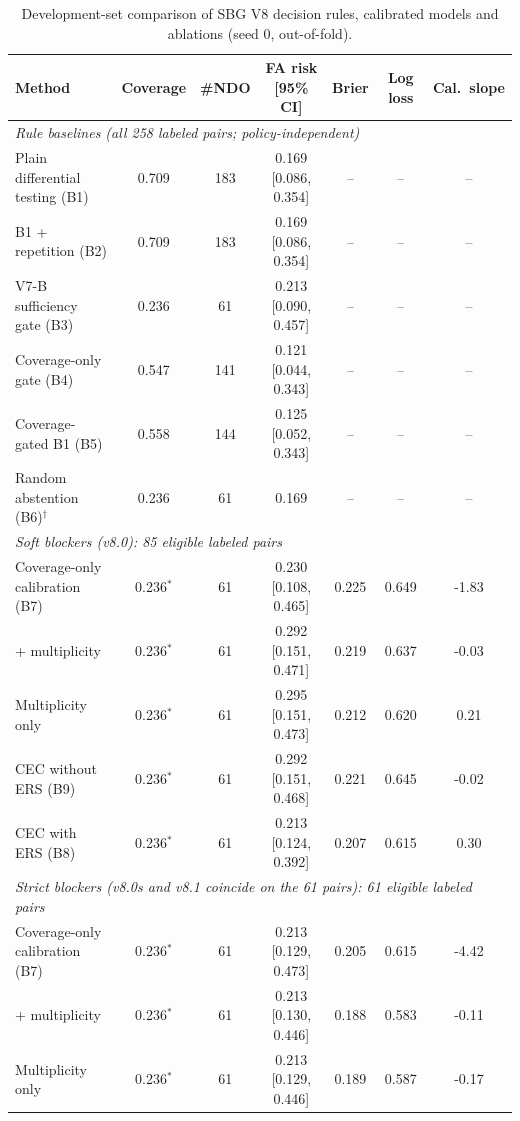 \begin{table}[!t]
\caption{Development-set comparison of SBG V8 decision rules, calibrated models and ablations (seed 0, out-of-fold).}
\label{tab:ablation}
\centering
\footnotesize
\begin{tabular}{|l|c|c|c|c|c|c|}
\hline
Method & Coverage & \#NDO & FA risk [95\% CI] & Brier & Log loss & Cal.\ slope \\
\hline
\multicolumn{7}{l}{\emph{Rule baselines (all 258 labeled pairs; policy-independent)}} \\
Plain differential testing (B1) & 0.709 & 183 & 0.169 [0.086, 0.354] & -- & -- & -- \\
B1 + repetition (B2) & 0.709 & 183 & 0.169 [0.086, 0.354] & -- & -- & -- \\
V7-B sufficiency gate (B3) & 0.236 & 61 & 0.213 [0.090, 0.457] & -- & -- & -- \\
Coverage-only gate (B4) & 0.547 & 141 & 0.121 [0.044, 0.343] & -- & -- & -- \\
Coverage-gated B1 (B5) & 0.558 & 144 & 0.125 [0.052, 0.343] & -- & -- & -- \\
Random abstention (B6)$^\dagger$ & 0.236 & 61 & 0.169 & -- & -- & -- \\
\hline
\multicolumn{7}{l}{\emph{Soft blockers (v8.0): 85 eligible labeled pairs}} \\
Coverage-only calibration (B7) & 0.236$^\ast$ & 61 & 0.230 [0.108, 0.465] & 0.225 & 0.649 & -1.83 \\
\quad + multiplicity & 0.236$^\ast$ & 61 & 0.292 [0.151, 0.471] & 0.219 & 0.637 & -0.03 \\
Multiplicity only & 0.236$^\ast$ & 61 & 0.295 [0.151, 0.473] & 0.212 & 0.620 & 0.21 \\
CEC without ERS (B9) & 0.236$^\ast$ & 61 & 0.292 [0.151, 0.468] & 0.221 & 0.645 & -0.02 \\
CEC with ERS (B8) & 0.236$^\ast$ & 61 & 0.213 [0.124, 0.392] & 0.207 & 0.615 & 0.30 \\
\hline
\multicolumn{7}{l}{\emph{Strict blockers (v8.0s and v8.1 coincide on the 61 pairs): 61 eligible labeled pairs}} \\
Coverage-only calibration (B7) & 0.236$^\ast$ & 61 & 0.213 [0.129, 0.473] & 0.205 & 0.615 & -4.42 \\
\quad + multiplicity & 0.236$^\ast$ & 61 & 0.213 [0.130, 0.446] & 0.188 & 0.583 & -0.11 \\
Multiplicity only & 0.236$^\ast$ & 61 & 0.213 [0.129, 0.446] & 0.189 & 0.587 & -0.17 \\

\end{tabular}
\end{table}
